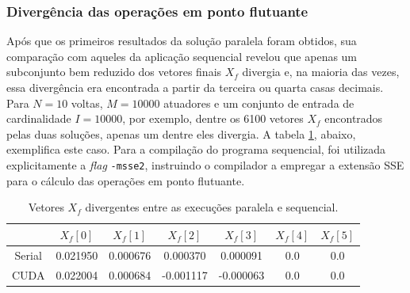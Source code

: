 \documentclass[12pt]{article}
\begin{document}
\subsubsection{Divergência das operações em ponto flutuante}

Após que os primeiros resultados da solução paralela foram obtidos, sua
comparação com aqueles da aplicação sequencial revelou que apenas um subconjunto
bem reduzido dos vetores finais \(X_f\) divergia e, na maioria das vezes, essa
divergência era encontrada a partir da terceira ou quarta casas decimais. Para
\(N = 10\) voltas, \(M = 10000\) atuadores e um conjunto de entrada de
cardinalidade \(I = 10000\), por exemplo, dentre os 6100 vetores \(X_f\)
encontrados pelas duas soluções, apenas um dentre eles divergia. A tabela
\ref{tab:div}, abaixo, exemplifica este caso. Para a compilação do programa
sequencial, foi utilizada explicitamente a \textit{flag} \texttt{-msse2},
instruindo o compilador a empregar a extensão SSE para o cálculo das operações
em ponto flutuante.

\begin{table}[h]
    \centering
    \small
	\caption{\label{tab:div} Vetores \(X_f\) divergentes entre as execuções
	paralela e sequencial.}
	\begin{tabular}{| c | c | c | c | c | c | c | }
		\hline
		 & \(X_f[0]\) & \(X_f[1]\) & \(X_f[2]\) & \(X_f[3]\) & \(X_f[4]\) & \(X_f[5]\) \\ \hline 
		Serial & 0.021950 & 0.000676  & 0.000370  & 0.000091 & 0.0 & 0.0 \\\hline 
		CUDA & 0.022004 & 0.000684  & -0.001117  & -0.000063 & 0.0 & 0.0 \\\hline 
	\end{tabular}
\end{table}
\end{document}
